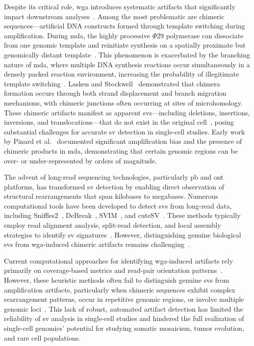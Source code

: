 \documentclass[pdflatex,sn-nature,lineno]{sn-jnl}%
\theoremstyle{thmstyleone}%
\theoremstyle{thmstyletwo}%
\theoremstyle{thmstylethree}%
\begin{document}
Despite its critical role, \gls{wga} introduces systematic artifacts that significantly impact downstream analyses~\cite{lu2023chimera,lu2023exploration, pinard2006assessment,lasken2007mechanism,chen2017singlecell}.
Among the most problematic are chimeric sequences—artificial DNA constructs formed through template switching during amplification.
During \gls{mda}, the highly processive $\Phi29$ polymerase can dissociate from one genomic template and reinitiate synthesis on a spatially proximate but genomically distant template~\cite{lasken2007mechanism,lu2023chimera}.
This phenomenon is exacerbated by the branching nature of \gls{mda}, where multiple DNA synthesis reactions occur simultaneously in a densely packed reaction environment, increasing the probability of illegitimate template switching~\cite{lasken2007mechanism}.
Lasken and Stockwell~\cite{lasken2007mechanism} demonstrated that chimera formation occurs through both strand displacement and branch migration mechanisms, with chimeric junctions often occurring at sites of microhomology.
These chimeric artifacts manifest as apparent \glspl{sv}—including deletions, insertions, inversions, and translocations—that do not exist in the original cell~\cite{lu2023chimera,agyabeng2025evaluating}, posing substantial challenges for accurate \gls{sv} detection in single-cell studies.
Early work by Pinard et al.~\cite{pinard2006assessment} documented significant amplification bias and the presence of chimeric products in \gls{mda}, demonstrating that certain genomic regions can be over- or under-represented by orders of magnitude.

The advent of long-read sequencing technologies, particularly \gls{pb} and \gls{ont} platforms, has transformed \gls{sv} detection by enabling direct observation of structural rearrangements that span kilobases to megabases.
Numerous computational tools have been developed to detect \glspl{sv} from long-read data, including
Sniffles2~\cite{Sedlazeck2018,Smolka2024}, DeBreak~\cite{chen2023deciphering}, SVIM~\cite{heller2019svim}, and cuteSV~\cite{jiang2020longreadbased}.
These methods typically employ read alignment analysis, split-read detection, and local assembly strategies to identify \gls{sv} signatures~\cite{alkan2011genome}.
However, distinguishing genuine biological \glspl{sv} from \gls{wga}-induced chimeric artifacts remains challenging~\cite{kiguchi2021longread,lu2023exploration,kosugi2019comprehensive,mahmoud2019structural}.

Current computational approaches for identifying \gls{wga}-induced artifacts rely primarily on coverage-based metrics and read-pair orientation patterns~\cite{kiguchi2021longread, lu2023exploration}.
However, these heuristic methods often fail to distinguish genuine \glspl{sv} from amplification artifacts, particularly when chimeric sequences exhibit complex rearrangement patterns, occur in repetitive genomic regions, or involve multiple genomic loci~\cite{kosugi2019comprehensive,mahmoud2019structural}.
This lack of robust, automated artifact detection has limited the reliability of \gls{sv} analysis in single-cell studies and hindered the full realization of single-cell genomics' potential for studying somatic mosaicism, tumor evolution, and rare cell populations.
\end{document}
